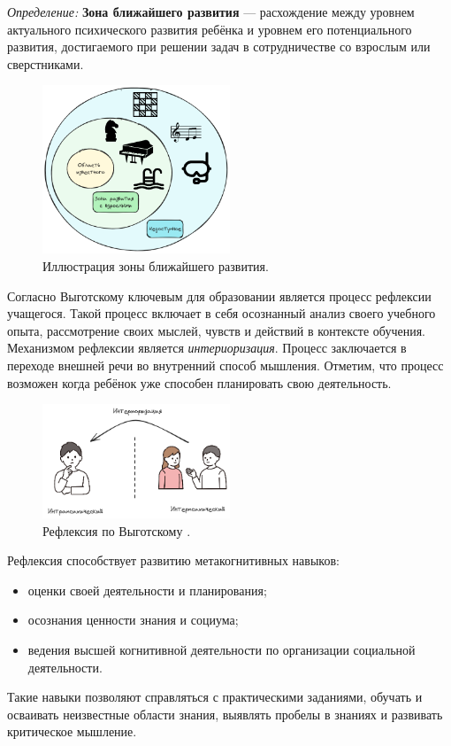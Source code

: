 \textit{Определение:} \textbf{Зона ближайшего развития} --- расхождение между уровнем актуального психического развития ребёнка
 и уровнем его потенциального развития, достигаемого при решении задач в сотрудничестве со взрослым или сверстниками. 

 \begin{figure}[h]
    \centering
    \includegraphics[width=0.5\textwidth]{assets/pedagogic/psy/proximal_growth.excalidraw.png}
    \caption{Иллюстрация зоны ближайшего развития.}
    \label{proximal_growth}
\end{figure}


Согласно Выготскому ключевым для образовании является процесс рефлексии учащегося.
Такой процесс включает в себя осознанный анализ своего учебного опыта, рассмотрение своих мыслей, чувств и действий в контексте обучения. 
Механизмом рефлексии является \textit{интериоризация}. Процесс заключается в переходе внешней речи во внутренний способ мышления.
Отметим, что процесс возможен когда ребёнок уже способен планировать свою деятельность. 
 
\begin{figure}[h]
    \centering
    \includegraphics[width=0.5\textwidth]{assets/pedagogic/psy/reflection.excalidraw.png}
    \caption{Рефлексия по Выготскому \cite{выготский2014мышление}.}
    \label{reflection}
\end{figure}
 
 Рефлексия способствует развитию метакогнитивных навыков:
  \begin{itemize}
     \item оценки своей деятельности и планирования;
     \item осознания ценности знания и социума;
     \item ведения высшей когнитивной деятельности по организации социальной деятельности.
 \end{itemize}
Такие навыки позволяют справляться с практическими заданиями, обучать и осваивать неизвестные области знания,
выявлять пробелы в знаниях и развивать критическое мышление.

